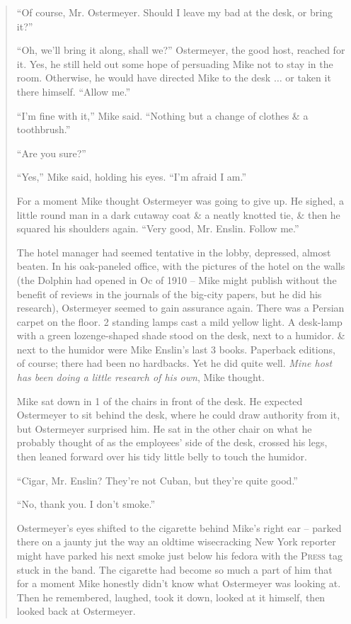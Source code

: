 \documentclass{article}
\numberwithin{equation}{section}
\begin{document}
\begin{quotation}
	``Of course, Mr. Ostermeyer. Should I leave my bad at the desk, or bring it?''
	
	``Oh, we'll bring it along, shall we?'' Ostermeyer, the good host, reached for it. Yes, he still held out some hope of persuading Mike not to stay in the room. Otherwise, he would have directed Mike to the desk $\ldots$ or taken it there himself. ``Allow me.''
	
	``I'm fine with it,'' Mike said. ``Nothing but a change of clothes \& a toothbrush.''
	
	``Are you sure?''
	
	``Yes,'' Mike said, holding his eyes. ``I'm afraid I am.''
	
	For a moment Mike thought Ostermeyer was going to give up. He sighed, a little round man in a dark cutaway coat \& a neatly knotted tie, \& then he squared his shoulders again. ``Very good, Mr. Enslin. Follow me.''
	
	The hotel manager had seemed tentative in the lobby, depressed, almost beaten. In his oak-paneled office, with the pictures of the hotel on the walls (the Dolphin had opened in Oc of 1910 -- Mike might publish without the benefit of reviews in the journals of the big-city papers, but he did his research), Ostermeyer seemed to gain assurance again. There was a Persian carpet on the floor. 2 standing lamps cast a mild yellow light. A desk-lamp with a green lozenge-shaped shade stood on the desk, next to a humidor. \& next to the humidor were Mike Enslin's last 3 books. Paperback editions, of course; there had been no hardbacks. Yet he did quite well. \textit{Mine host has been doing a little research of his own}, Mike thought.
	
	Mike sat down in 1 of the chairs in front of the desk. He expected Ostermeyer to sit behind the desk, where he could draw authority from it, but Ostermeyer surprised him. He sat in the other chair on what he probably thought of as the employees' side of the desk, crossed his legs, then leaned forward over his tidy little belly to touch the humidor.
	
	``Cigar, Mr. Enslin? They're not Cuban, but they're quite good.''
	
	``No, thank you. I don't smoke.''
	
	Ostermeyer's eyes shifted to the cigarette behind Mike's right ear -- parked there on a jaunty jut the way an oldtime wisecracking New York reporter might have parked his next smoke just below his fedora with the \textsc{Press} tag stuck in the band. The cigarette had become so much a part of him that for a moment Mike honestly didn't know what Ostermeyer was looking at. Then he remembered, laughed, took it down, looked at it himself, then looked back at Ostermeyer.
	

\end{quotation}
\end{document}
